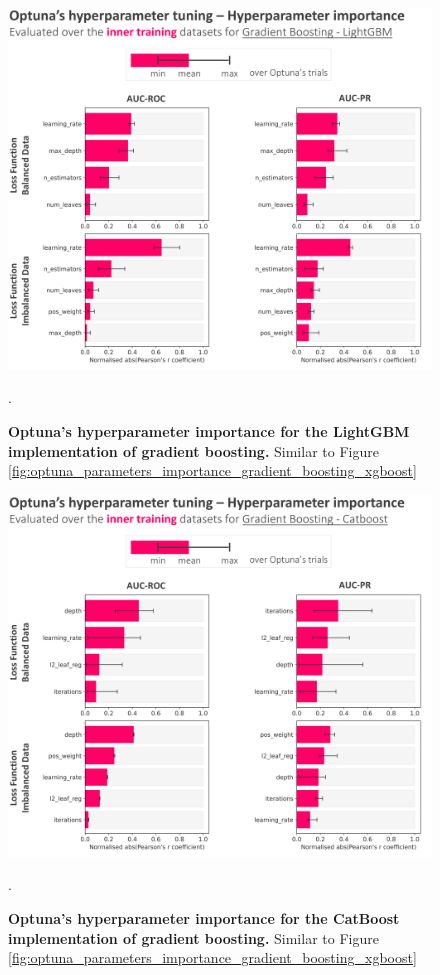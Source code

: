\begin{figure}[htbp]
\centering
\includegraphics[scale=0.9]{optuna_parameters_importance_gradient_boosting_lightgbm.png}
\caption{\textbf{Optuna's hyperparameter importance for the LightGBM implementation of gradient boosting.} Similar to Figure \ref{fig:optuna_parameters_importance_gradient_boosting_xgboost}}.
\label{fig:optuna_parameters_importance_gradient_boosting_lightgbm}
\end{figure}

\begin{figure}[htbp]
\centering
\includegraphics[scale=0.9]{optuna_parameters_importance_gradient_boosting_catboost.png}
\caption{\textbf{Optuna's hyperparameter importance for the CatBoost implementation of gradient boosting.} Similar to Figure \ref{fig:optuna_parameters_importance_gradient_boosting_xgboost}}.
\label{fig:optuna_parameters_importance_gradient_boosting_catboost}
\end{figure}

